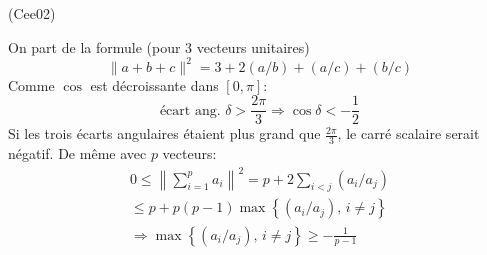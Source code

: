 \begin{tiny}(Cee02)\end{tiny} On part de la formule (pour 3 vecteurs unitaires)
\begin{displaymath}
  \|a+b+c\|^2 = 3 + 2 (a/b) + (a/c) + (b/c)
\end{displaymath}
Comme $\cos$ est décroissante dans $[0,\pi]$: 
\begin{displaymath}
  \text{écart ang. } \delta > \frac{2\pi}{3} \Rightarrow \cos \delta <  -\frac{1}{2} 
\end{displaymath}
Si les trois écarts angulaires étaient plus grand que $\frac{2\pi}{3}$, le carré scalaire serait négatif.\newline
De même avec $p$ vecteurs:
\begin{multline*}
  0\leq \left\| \sum_{i=1}^{p} a_i\right\|^2 
 = p + 2 \sum_{i < j}(a_i/a_j) \\
 \leq p + p(p-1)\max\left\lbrace (a_i/a_j) ,\,i\neq j\right\rbrace \\
 \Rightarrow \max\left\lbrace (a_i/a_j) ,\,i\neq j\right\rbrace \geq -\frac{1}{p-1}
\end{multline*}